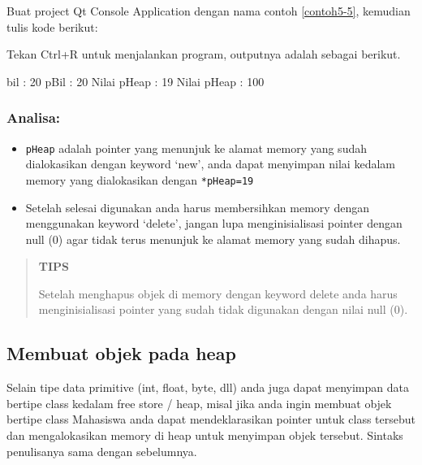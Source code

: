 Buat project Qt Console Application dengan nama contoh \ref{contoh5-5}, kemudian tulis
kode berikut:



Tekan Ctrl+R untuk menjalankan program, outputnya adalah sebagai
berikut.

\begin{lcverbatim}
bil : 20
pBil : 20
Nilai pHeap : 19
Nilai pHeap : 100
\end{lcverbatim}

\subsubsection*{Analisa:}

\begin{itemize}

\item
  \texttt{pHeap} adalah pointer yang menunjuk ke alamat memory yang
  sudah dialokasikan dengan keyword `new', anda dapat menyimpan nilai
  kedalam memory yang dialokasikan dengan \texttt{*pHeap=19}
\item
  Setelah selesai digunakan anda harus membersihkan memory dengan
  menggunakan keyword `delete', jangan lupa menginisialisasi pointer
  dengan null (0) agar tidak terus menunjuk ke alamat memory yang sudah
  dihapus.
\end{itemize}


 
 \begin{quotation}
 {\LARGE {}}  	 \textbf{TIPS}
 	 
 	 Setelah menghapus objek di memory dengan keyword delete anda harus
 	 menginisialisasi pointer yang sudah tidak digunakan dengan nilai null
 	 (0).
 \end{quotation} 

\subsection{Membuat objek pada heap}\label{membuat-objek-pada-heap}

Selain tipe data primitive (int, float, byte, dll) anda juga dapat
menyimpan data bertipe class kedalam free store / heap, misal jika anda
ingin membuat objek bertipe class Mahasiswa anda dapat mendeklarasikan
pointer untuk class tersebut dan mengalokasikan memory di heap untuk
menyimpan objek tersebut. Sintaks penulisanya sama dengan sebelumnya.

